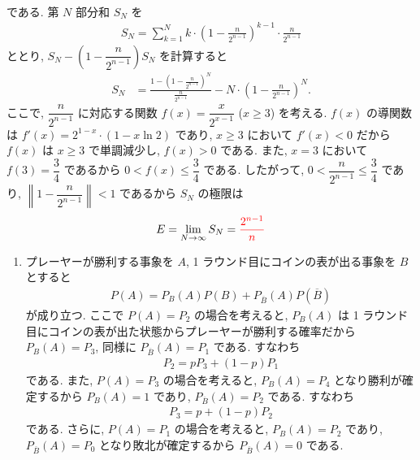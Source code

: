 \begin{qenumerate}
{\begin{enumerate}
{\begin{align}
				\end{align}
				である.
				第 $N$ 部分和 $S_{N}$ を
				\begin{align}
					S_{N} = \sum_{k = 1}^{N}{k\cdot\left(1 - \frac{n}{2^{n - 1}}\right)^{k - 1}\cdot\frac{n}{2^{n - 1}}}
				\end{align}
				ととり, $S_{N} - \left(1 - \dfrac{n}{2^{n - 1}}\right)S_{N}$ を計算すると
				\begin{align}
					S_{N} &= \frac{1 - \left(1 - \frac{n}{2^{n - 1}}\right)^{N}}{\frac{n}{2^{n - 1}}} - N\cdot\left(1 - \frac{n}{2^{n - 1}}\right)^{N}.
				\end{align}
				ここで, $\dfrac{n}{2^{n - 1}}$ に対応する関数 $f(x) = \dfrac{x}{2^{x - 1}}$ ($x\geq3 $) を考える.
				$f(x)$ の導関数は $f'(x) = 2^{1 - x}\cdot (1 - x\ln{2})$ であり, $x\geq 3$ において $f'(x) < 0$ だから $f(x)$ は $x\geq3$ で単調減少し, $f(x) > 0$ である.
				また, $x = 3$ において $f(3) = \dfrac{3}{4}$ であるから $0 < f(x) \leq \dfrac{3}{4}$ である.
				したがって, $0 < \dfrac{n}{2^{n - 1}} \leq \dfrac{3}{4}$ であり, $\left\|1 - \dfrac{n}{2^{n - 1}}\right\| < 1$ であるから $S_{N}$ の極限は
				\begin{align}
					E = \lim_{N\to\infty}{S_{N}} = \textcolor{red}{\frac{2^{n - 1}}{n}}
				\end{align}
			}
		\end{enumerate}
	}
	\item{
		\begin{enumerate}
			\item{
				プレーヤーが勝利する事象を $A$, 1 ラウンド目にコインの表が出る事象を $B$ とすると
				\begin{align}
					P(A) = P_{B}(A)P(B) + P_{\overline{B}}(A)P\left(\overline{B}\right)
				\end{align}
				が成り立つ.
				ここで $P(A) = P_{2}$ の場合を考えると, $P_{B}(A)$ は 1 ラウンド目にコインの表が出た状態からプレーヤーが勝利する確率だから $P_{B}(A) = P_{3}$, 同様に $P_{\overline{B}}(A) = P_{1}$ である.
				すなわち
				\begin{align}
					P_{2} = pP_{3} + (1 - p)P_{1}
				\end{align}
				である.
				また, $P(A) = P_{3}$ の場合を考えると, $P_{B}(A) = P_{4}$ となり勝利が確定するから $P_{B}(A) = 1$ であり, $P_{\overline{B}}(A) = P_{2}$ である.
				すなわち
				\begin{align}
					P_{3} = p + (1 - p)P_{2}
				\end{align}
				である.
				さらに, $P(A) = P_{1}$ の場合を考えると, $P_{B}(A) = P_{2}$ であり, $P_{\overline{B}}(A) = P_{0}$ となり敗北が確定するから $P_{\overline{B}}(A) = 0$ である.
}
\end{enumerate}}
\end{qenumerate}
